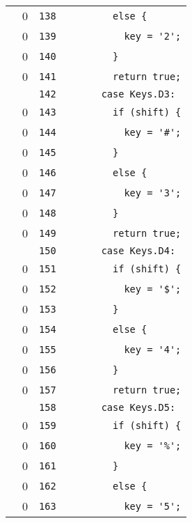 \documentclass[a4paper,10pt]{article}
\begin{document}
\begin{longtable}[l]{lrrl}
\cellcolor{red} & 0 & \verb~138~ & \verb~        else {~\\
\cellcolor{red} & 0 & \verb~139~ & \verb~          key = '2';~\\
\cellcolor{red} & 0 & \verb~140~ & \verb~        }~\\
\cellcolor{red} & 0 & \verb~141~ & \verb~        return true;~\\
\cellcolor{gray} &  & \verb~142~ & \verb~      case Keys.D3:~\\
\cellcolor{red} & 0 & \verb~143~ & \verb~        if (shift) {~\\
\cellcolor{red} & 0 & \verb~144~ & \verb~          key = '#';~\\
\cellcolor{red} & 0 & \verb~145~ & \verb~        }~\\
\cellcolor{red} & 0 & \verb~146~ & \verb~        else {~\\
\cellcolor{red} & 0 & \verb~147~ & \verb~          key = '3';~\\
\cellcolor{red} & 0 & \verb~148~ & \verb~        }~\\
\cellcolor{red} & 0 & \verb~149~ & \verb~        return true;~\\
\cellcolor{gray} &  & \verb~150~ & \verb~      case Keys.D4:~\\
\cellcolor{red} & 0 & \verb~151~ & \verb~        if (shift) {~\\
\cellcolor{red} & 0 & \verb~152~ & \verb~          key = '$';~\\
\cellcolor{red} & 0 & \verb~153~ & \verb~        }~\\
\cellcolor{red} & 0 & \verb~154~ & \verb~        else {~\\
\cellcolor{red} & 0 & \verb~155~ & \verb~          key = '4';~\\
\cellcolor{red} & 0 & \verb~156~ & \verb~        }~\\
\cellcolor{red} & 0 & \verb~157~ & \verb~        return true;~\\
\cellcolor{gray} &  & \verb~158~ & \verb~      case Keys.D5:~\\
\cellcolor{red} & 0 & \verb~159~ & \verb~        if (shift) {~\\
\cellcolor{red} & 0 & \verb~160~ & \verb~          key = '%';~\\
\cellcolor{red} & 0 & \verb~161~ & \verb~        }~\\
\cellcolor{red} & 0 & \verb~162~ & \verb~        else {~\\
\cellcolor{red} & 0 & \verb~163~ & \verb~          key = '5';~\\

\end{longtable}
\end{document}
